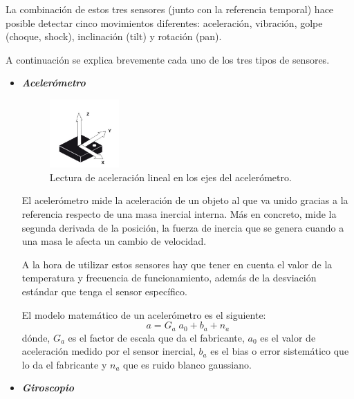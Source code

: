 La combinación de estos tres sensores (junto con la referencia temporal) hace posible detectar cinco movimientos diferentes: aceleración, vibración, golpe (choque, shock), inclinación (tilt) y rotación (pan).

A continuación se explica brevemente cada uno de los tres tipos de sensores. \cite{juanDiego}

	\begin{itemize}
		\item \textit{\textbf{Acelerómetro}}	
		\begin{figure}[H]
			\centering
			\includegraphics[width=0.25\textwidth]{./img/IMUacelerometro}
			\caption{Lectura de aceleración lineal en los ejes del acelerómetro. \cite{juanDiego}} 
			\label{fig:IMUacelerometro}
		\end{figure} 
		
		El acelerómetro mide la aceleración de un objeto al que va unido gracias a la referencia respecto de una masa inercial interna. Más en concreto, mide la segunda derivada de la posición, la fuerza de inercia que se genera cuando a una masa le afecta un cambio de velocidad.
		
		A la hora de utilizar estos sensores hay que tener en cuenta el valor de la temperatura y frecuencia de funcionamiento, además de la desviación estándar que tenga el sensor específico.
		
		El modelo matemático de un acelerómetro es el siguiente:
		\begin{equation}
			\label{eq:modeloAcelera}
			a = G_{a}\; a_{0} + b_{a} + n_{a}
		\end{equation}
		dónde, $ G_{a} $ es el factor de escala que da el fabricante, $ a_{0} $ es el valor de aceleración medido por el sensor inercial,  $ b_{a} $ es el bias o error sistemático que lo da el fabricante y $ n_{a} $ que es ruido blanco gaussiano.
		
	
		\item \textit{\textbf{Giroscopio}}	
		

\end{itemize}

